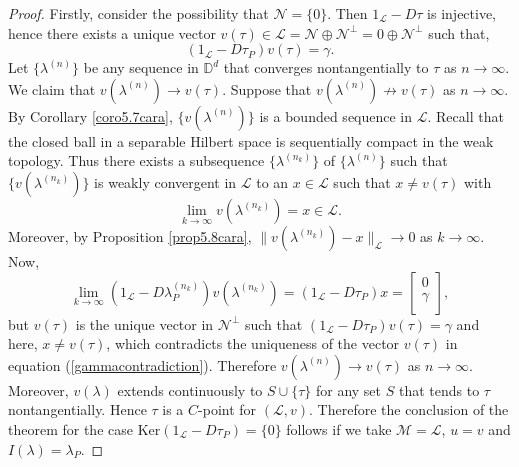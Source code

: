 \documentclass[11pt, reqno]{amsart}
\newcommand\1{\boldsymbol {1}}
\numberwithin{equation}{section}
\begin{document}
\begin{proof}
Firstly, consider the possibility that $\mathcal{N}=\{0\}$. Then $1_{\mathcal{L}}-D\tau$ is injective, hence there exists a unique vector $v(\tau)\in\mathcal{L}=\mathcal{N}\oplus\mathcal{N}^{\perp}=0\oplus \mathcal{N}^{\perp}$ such that,
\begin{equation}\label{gammacontradiction}
(1_{\mathcal{L}}-D\tau_{P})v(\tau)=
	\gamma.
\end{equation}
Let $\{\lambda^{(n)}\}$ be any sequence in $\mathbb{D}^{d}$ that converges nontangentially to $\tau$ as $n\rightarrow \infty$. We claim that $v(\lambda^{(n)})\rightarrow v(\tau)$. Suppose that $v(\lambda^{(n)})\nrightarrow v(\tau)$ as $n\rightarrow \infty$. By Corollary \ref{coro5.7cara}, $\{v(\lambda^{(n)})\}$ is a bounded sequence in $\mathcal{L}$. Recall that the closed ball in a separable  Hilbert space is sequentially compact in the weak topology. Thus there exists a subsequence $\{\lambda^{(n_k)}\}$ of $\{\lambda^{(n)}\}$ such that $\{v(\lambda^{(n_k)})\}$ is weakly convergent in $\mathcal{L}$ to an $x\in\mathcal{L}$ such that $x\neq v(\tau)$ with 
$$\lim_{k\rightarrow \infty} v(\lambda^{(n_k)})=x \in \mathcal{L}.$$
Moreover, by Proposition \ref{prop5.8cara}, $\|v(\lambda^{(n_k)})-x\|_{\mathcal{L}}\rightarrow 0$ as $k\rightarrow \infty$. Now,
$$\lim_{k \rightarrow \infty}(1_{\mathcal{L}}-D\lambda_{P}^{(n_k)})v(\lambda^{(n_k)})=(1_{\mathcal{L}}-D\tau_{P})x= \begin{bmatrix} 
	0 \\
	\gamma \\
\end{bmatrix},$$
but $v(\tau)$ is the unique vector in $\mathcal{N}^{\perp}$ such that $(1_{\mathcal{L}}-D\tau_{P})v(\tau)=\gamma$ and here, $x\neq v(\tau)$, which contradicts the uniqueness of the vector $v(\tau)$ in equation (\ref{gammacontradiction}). Therefore $v(\lambda^{(n)})\rightarrow v(\tau)$ as $n\rightarrow \infty$. Moreover, $v(\lambda)$ extends continuously to $S\cup\{\tau\}$ for any set $S$ that tends to $\tau$ nontangentially. Hence $\tau$ is a $C$-point for $(\mathcal{L},v)$. Therefore the conclusion of the theorem for the case $\mathrm{Ker}(1_{\mathcal{L}}-D\tau_{P})=\{0\}$ follows if we take $\mathcal{M}=\mathcal{L}$, $u=v$ and $I(\lambda)=\lambda_{P}$.


\end{proof}
\end{document}
